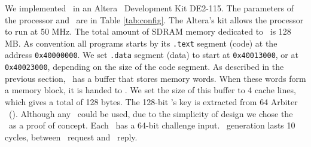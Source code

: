 We implemented \cshia~in an Altera \fpga~Development Kit DE2-115. The parameters of the processor and \cshia~are in Table \ref{tab:config}. The Altera's kit allows the processor to run at 50 MHz. The total amount of SDRAM memory dedicated to \leon~is 128 MB. As convention all programs starts by its \texttt{.text} segment (code) at the address \texttt{0x40000000}. We set \texttt{.data} segment (data) to start at \texttt{0x40013000}, or at \texttt{0x40023000}, depending on the size of the code segment. As described in the previous section, \handler~has a buffer that stores memory words. When these words form a memory block, it is handed to \seceng. We set the size of this buffer to 4 cache lines, which gives a total of 128 bytes. The 128-bit \siphash's key is extracted from 64 Arbiter \pufs~(\apufs). Although any \puf~could be used, due to the simplicity of design we chose the \apuf~as a proof of concept. Each \apuf~has a 64-bit challenge input. \ptag~generation lasts 10 cycles, between \seceng~request and \ptaggen~reply.

